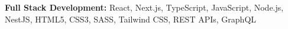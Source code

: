 \textbf{Full Stack Development:} React, Next.js, TypeScript, JavaScript, Node.js, NestJS, HTML5, CSS3, SASS, Tailwind CSS, REST APIs, GraphQL
